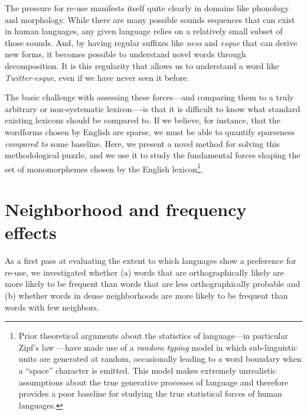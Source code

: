 \documentclass{article}
\begin{document}
The pressure for re-use manifests itself quite clearly in domains like phonology and morphology. While there
are many possible sounds sequences that can exist in human languages, any given language relies on a
relatively small subset of those sounds. And, by having regular suffixes like \textit{ness} and \textit{esque}
that can derive new forms, it becomes possible to understand novel words through decomposition. It is this
regularity that allows us to understand a word like \textit{Twitter-esque}, even if we have never seen it
before.

The basic challenge with assessing these forces---and comparing them to a truly arbitrary or non-systematic
lexicon----is that it is difficult to know what standard existing lexicons should be compared to. If we
believe, for instance, that the wordforms chosen by English are sparse, we must be able to quantify sparseness
\emph{compared to} some baseline. Here, we present a novel method for solving this methodological puzzle, and
we use it to study the fundamental forces shaping the set of monomorphemes chosen by the English
lexicon\footnote{Prior theoretical arguments about the statistics of language---in particular Zipf's law
\cite{mandelbrot_informational,miller1957some}---have made use of a \emph{random typing} model in which
sub-linguistic units are generated at random, occasionally leading to a word boundary when a ``space''
character is emitted. This model makes extremely unrealistic assumptions about the true generative processes
of language \cite{howes1968zipf,piantadosi2012information} and therefore provides a poor baseline for studying
the true statistical forces of human languages.}.


\section{Neighborhood and frequency effects} 


As a first pass at evaluating the extent to which languages show a preference for re-use, we investigated
whether (a) words that are orthographically likely are more likely to be frequent than words that are less
orthographically probable and (b) whether words in dense neighborhoods are more likely to be frequent than
words with few neighbors.
\end{document}
